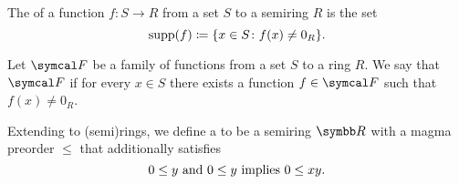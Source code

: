 \begin{definition}\label{def:function_support}
  The  of a function \( f: S \to R \) from a set \( S \) to a semiring \( R \) is the set
  \begin{equation*}
    \operatorname{supp}(f) \coloneqq \{ x \in S \colon f(x) \neq 0_R \}.
  \end{equation*}
\end{definition}

\begin{definition}\label{def:functions_vanish_nowhere}
  Let \( \Cal{F} \) be a family of functions from a set \( S \) to a ring \( R \). We say that \( \Cal{F} \)  if for every \( x \in S \) there exists a function \( f \in \Cal{F} \) such that \( f(x) \neq 0_R \).
\end{definition}

\begin{definition}\label{def:ordered_semiring}
  Extending  to (semi)rings, we define a  to be a semiring \( \BR \) with a magma preorder \( \leq \) that additionally satisfies
  \begin{equation}\label{eq:def:ordered_semiring/nonnegativity}
    0 \leq y \text{ and } 0 \leq y \text{ implies } 0 \leq xy.
  \end{equation}
\end{definition}

